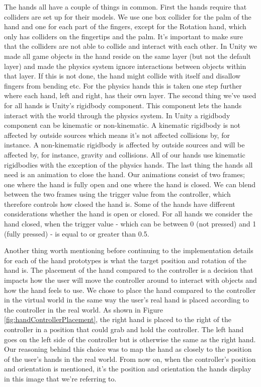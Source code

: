 The hands all have a couple of things in common. First the hands require that colliders are set up for their models. We use one box collider for the palm of the hand and one for each part of the fingers, except for the Rotation hand, which only has colliders on the fingertips and the palm. It's important to make sure that the colliders are not able to collide and interact with each other. In Unity we made all game objects in the hand reside on the same layer (but not the default layer) and made the physics system ignore interactions between objects within that layer. If this is not done, the hand might collide with itself and disallow fingers from bending etc. For the physics hands this is taken one step further where each hand, left and right, has their own layer. The second thing we've used for all hands is Unity's rigidbody component. This component lets the hands interact with the world through the physics system. In Unity a rigidbody component can be kinematic or non-kinematic. A kinematic rigidbody is not affected by outside sources which means it's not affected collisions by, for instance. A non-kinematic rigidbody is affected by outside sources and will be affected by, for instance, gravity and collisions. All of our hands use kinematic rigidbodies with the exception of the physics hands. The last thing the hands all need is an animation to close the hand. Our animations consist of two frames; one where the hand is fully open and one where the hand is closed. We can blend between the two frames using the trigger value from the controller, which therefore controls how closed the hand is. Some of the hands have different considerations whether the hand is open or closed. For all hands we consider the hand closed, when the trigger value - which can be between 0 (not pressed) and 1 (fully pressed) - is equal to or greater than 0.5.

Another thing worth mentioning before continuing to the implementation details for each of the hand prototypes is what the target position and rotation of the hand is. The placement of the hand compared to the controller is a decision that impacts how the user will move the controller around to interact with objects and how the hand feels to use. We chose to place the hand compared to the controller in the virtual world in the same way the user's real hand is placed according to the controller in the real world. As shown in Figure \ref{fig:handControllerPlacement}, the right hand is placed to the right of the controller in a position that could grab and hold the controller. The left hand goes on the left side of the controller but is otherwise the same as the right hand. Our reasoning behind this choice was to map the hand as closely to the position of the user's hands in the real world. From now on, when the controller's position and orientation is mentioned, it's the position and orientation the hands display in this image that we're referring to.


